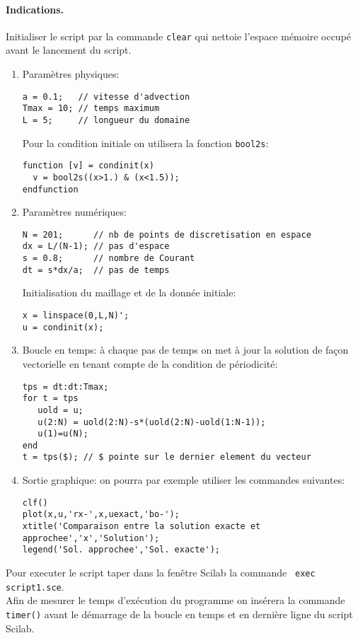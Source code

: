 \documentclass[12pt,a4paper]{article}
\begin{document}
\paragraph{Indications.} Initialiser le script par la commande \texttt{clear} qui nettoie
l'espace m\'emoire occup\'e avant le lancement du script.
\begin{enumerate}
\item Param\`etres physiques: 
\begin{verbatim}
a = 0.1;   // vitesse d'advection
Tmax = 10; // temps maximum
L = 5;     // longueur du domaine
\end{verbatim}
\noindent Pour la condition initiale on utilisera la fonction \texttt{bool2s}:
\begin{verbatim}
function [v] = condinit(x) 
  v = bool2s((x>1.) & (x<1.5));
endfunction
\end{verbatim}
\item Param\`etres num\'eriques:
\begin{verbatim}
N = 201;      // nb de points de discretisation en espace 
dx = L/(N-1); // pas d'espace 
s = 0.8;      // nombre de Courant 
dt = s*dx/a;  // pas de temps
\end{verbatim}
\noindent Initialisation du maillage et de la donn\'ee initiale:
\begin{verbatim}
x = linspace(0,L,N)';
u = condinit(x);
\end{verbatim}
\item Boucle en temps: \`a chaque pas de temps on met \`a jour la
solution de fa\c{c}on vectorielle en tenant compte de la condition de
p\'eriodicit\'e:
\begin{verbatim}
tps = dt:dt:Tmax;
for t = tps
   uold = u; 
   u(2:N) = uold(2:N)-s*(uold(2:N)-uold(1:N-1));
   u(1)=u(N);
end
t = tps($); // $ pointe sur le dernier element du vecteur
\end{verbatim}
\item Sortie graphique: on pourra par exemple utiliser les commandes suivantes:
\begin{verbatim}
clf()
plot(x,u,'rx-',x,uexact,'bo-');
xtitle('Comparaison entre la solution exacte et approchee','x','Solution');
legend('Sol. approchee','Sol. exacte');
\end{verbatim}
\end{enumerate}

\noindent Pour executer le script taper dans la fen\^etre Scilab la
commande \texttt{ exec script1.sce}. \\ Afin de mesurer le temps
d'ex\'ecution du programme on ins\'erera la commande \texttt{timer()}
avant le d\'emarrage de la boucle en temps et en derni\`ere ligne du
script Scilab.\\
\end{document}
